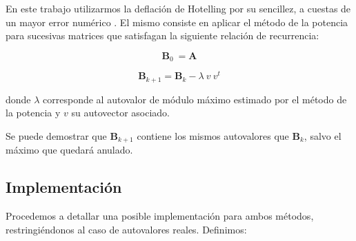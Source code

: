 \vspace{1em}
En este trabajo utilizarmos la deflación de Hotelling por su sencillez, a cuestas de un mayor error numérico \cite{Burden}. El mismo consiste en aplicar el método de la potencia para sucesivas matrices que satisfagan la siguiente relación de recurrencia:

\vspace{1em}
\begin{equation*}
    \mathbf{B}_0\ = \mathbf{A}
\end{equation*}

\begin{equation} \label{deflacion}
    \mathbf{B}_{k+1} = \mathbf{B}_{k} - \lambda\ v\ v^t 
\end{equation}

\vspace{1em}
\noindent donde $\lambda$ corresponde al autovalor de módulo máximo estimado por el método de la potencia y $v$ su autovector asociado.

\vspace{1em}
Se puede demostrar  que $\mathbf{B}_{k+1}$ contiene los mismos autovalores que $\mathbf{B}_{k}$, salvo el máximo que quedará anulado. %









\vspace{2em}
\subsection{Implementación} Procedemos a detallar una posible implementación para ambos métodos, restringiéndonos al caso de autovalores reales. Definimos:

